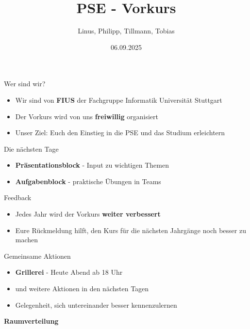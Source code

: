 \documentclass{../../presentation}
\title{PSE - Vorkurs}
\author{Linus, Philipp, Tillmann, Tobias}
\institute{FIUS - Fachgruppe Informatik Universität Stuttgart}
\date{06.09.2025}
\begin{document}
\begin{frame}
  \titlepage
\end{frame}

\begin{frame}{Wer sind wir?}
  \begin{itemize}
    \item Wir sind von \textbf{FIUS} der Fachgruppe Informatik Universität Stuttgart
    \item Der Vorkurs wird von uns \textbf{freiwillig} organisiert
    \item Unser Ziel: Euch den Einstieg in die PSE und das Studium erleichtern
  \end{itemize}
\end{frame}

\begin{frame}{Die nächsten Tage}
  \begin{itemize}
    \item \textbf{Präsentationsblock} - Input zu wichtigen Themen
    \item \textbf{Aufgabenblock} - praktische Übungen in Teams
  \end{itemize}
\end{frame}

\begin{frame}{Feedback}
  \begin{itemize}
    \item Jedes Jahr wird der Vorkurs \textbf{weiter verbessert}
    \item Eure Rückmeldung hilft, den Kurs für die nächsten Jahrgänge noch besser zu machen
  \end{itemize}
\end{frame}

\begin{frame}{Gemeinsame Aktionen}
  \begin{itemize}
    \item \textbf{Grillerei} - Heute Abend ab 18 Uhr
    \item und weitere Aktionen in den nächsten Tagen
    \item Gelegenheit, sich untereinander besser kennenzulernen
  \end{itemize}
\end{frame}

\begin{frame}[plain]
  \centering
  {\Huge\bfseries{Raumverteilung}}
\end{frame}
\end{document}
